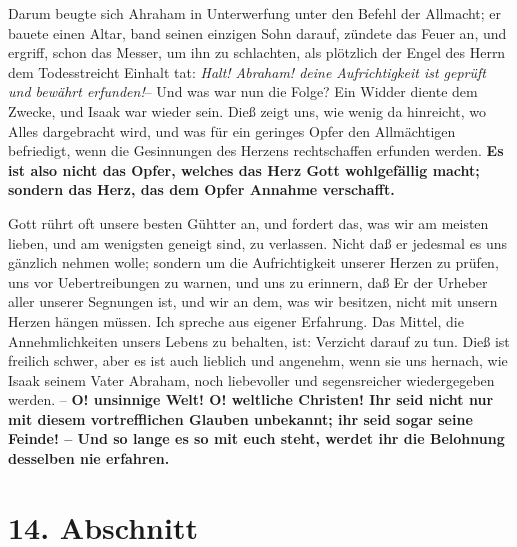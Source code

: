 Darum beugte sich Ahraham in Unterwerfung unter den Befehl der Allmacht;
 er
bauete einen Altar, band seinen einzigen Sohn darauf, zündete das Feuer an, und
ergriff, schon das Messer, um ihn zu schlachten, als plötzlich der Engel des
Herrn dem Todesstreicht Einhalt tat: \textit{Halt! Abraham! deine Aufrichtigkeit
ist
geprüft und bewährt erfunden!}-- Und was war nun die Folge? Ein Widder diente
dem Zwecke, und Isaak war wieder sein. Dieß zeigt uns, wie wenig da
hinreicht, wo Alles dargebracht wird, und was für ein geringes Opfer den
Allmächtigen befriedigt, wenn die Gesinnungen des Herzens rechtschaffen erfunden
werden. \textbf{Es ist also nicht das Opfer, welches das Herz Gott wohlgefällig
macht;
sondern das Herz, das dem Opfer Annahme verschafft.} 

\medskip

Gott rührt oft unsere besten Gühtter an, und fordert das, was wir am meisten
lieben, und am wenigsten geneigt sind, zu verlassen. Nicht daß er jedesmal es
uns gänzlich nehmen wolle; sondern um die Aufrichtigkeit unserer Herzen zu
prüfen, uns vor Uebertreibungen zu warnen, und uns zu erinnern, daß Er der
Urheber aller unserer Segnungen ist, und wir an dem, was wir besitzen, nicht mit
unsern Herzen hängen müssen. Ich spreche aus eigener Erfahrung. Das Mittel, die
Annehmlichkeiten unsers Lebens zu behalten, ist: Verzicht darauf zu tun. Dieß
ist freilich schwer, aber es ist auch lieblich und angenehm, wenn sie uns
hernach, wie Isaak seinem Vater Abraham, noch liebevoller und
segensreicher wiedergegeben werden. -- \textbf{O! unsinnige Welt! O! weltliche
Christen!
Ihr seid nicht nur mit diesem vortrefflichen Glauben unbekannt; ihr seid sogar
seine Feinde! -- Und so lange es so mit euch steht, werdet ihr die Belohnung
desselben nie erfahren.}

\section{14. Abschnitt} \label{kap4_ab14}

